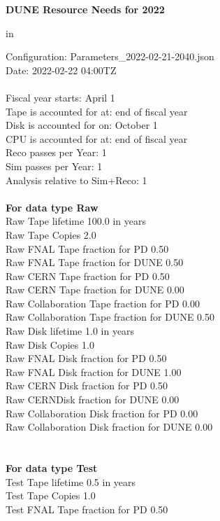 \documentclass[12pt]{article}
\begin{document}
\centerline{\bf{DUNE Resource Needs for 2022}} in \par Configuration: Parameters\_2022-02-21-2040.json\\
  Date: 2022-02-22 04:00TZ\\
   \\
  
 Fiscal year starts: April 1\\ 
Tape is accounted for at: end of fiscal year\\ 
Disk is accounted for on: October 1\\ 
CPU is accounted for at: end of fiscal year\\ 
Reco passes per Year: 1\\
Sim passes per Year: 1\\
Analysis relative to Sim+Reco: 1\\
\pagebreak
\\
{\bf For data type Raw}\\
   Raw Tape lifetime 100.0 in years\\
   Raw Tape Copies   2.0\\
   Raw FNAL Tape fraction for PD  0.50\\
   Raw FNAL Tape fraction for DUNE  0.50\\
   Raw CERN Tape fraction for PD  0.50\\
   Raw CERN Tape fraction for DUNE  0.00\\
   Raw Collaboration Tape fraction for PD  0.00\\
   Raw Collaboration Tape fraction for DUNE  0.50\\
   Raw Disk lifetime   1.0 in years\\
   Raw Disk Copies   1.0\\
   Raw FNAL Disk fraction for PD  0.50\\
   Raw FNAL Disk fraction for DUNE  1.00\\
   Raw CERN Disk fraction for PD  0.50\\
   Raw CERNDisk fraction for DUNE  0.00\\
   Raw Collaboration Disk fraction for PD  0.00\\
   Raw Collaboration Disk fraction for DUNE  0.00\\
\pagebreak\\
\\
{\bf For data type Test}\\
  Test Tape lifetime   0.5 in years\\
  Test Tape Copies   1.0\\
  Test FNAL Tape fraction for PD  0.50\\
\end{document}
